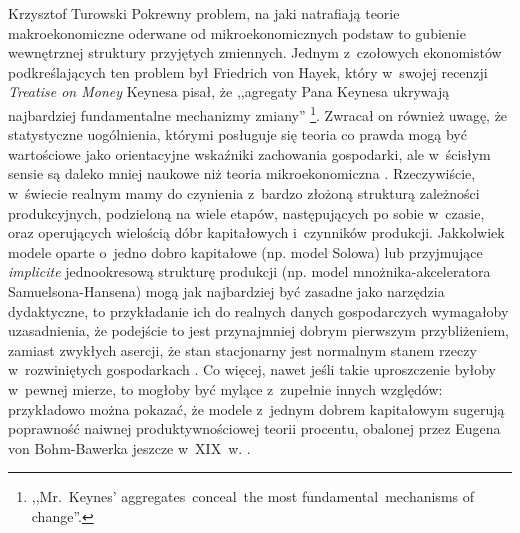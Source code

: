 \begin{artplenv}{Krzysztof Turowski}
Pokrewny problem, na jaki natrafiają teorie makroekonomiczne oderwane od mikroekonomicznych podstaw to gubienie
wewnętrznej struktury przyjętych zmiennych. Jednym z~czołowych ekonomistów podkreślających ten problem był Friedrich
von Hayek, który w~swojej recenzji \textit{Treatise on Money} Keynesa pisał, że ,,agregaty Pana Keynesa ukrywają
najbardziej fundamentalne mechanizmy zmiany''
\parencite[s.~277]{hayek_reflections_1931}\footnote{,,Mr.~Keynes'
aggregates~conceal~the most fundamental~mechanisms of change''.}. Zwracał on również uwagę, że statystyczne uogólnienia,
którymi posługuje się teoria co prawda mogą być wartościowe jako orientacyjne wskaźniki zachowania gospodarki,
ale w~ścisłym sensie są daleko mniej naukowe niż teoria mikroekonomiczna
\parencite{hayek_competition_2002}.
Rzeczywiście, w~świecie realnym mamy do czynienia z~bardzo złożoną strukturą zależności produkcyjnych, podzieloną na
wiele etapów, następujących po sobie w~czasie, oraz operujących wielością dóbr kapitałowych i~czynników produkcji.
Jakkolwiek modele oparte o~jedno dobro kapitałowe (np. model Solowa) lub przyjmujące \textit{implicite} jednookresową
strukturę produkcji (np. model mnożnika-akceleratora Samuelsona-Hansena) mogą jak najbardziej być zasadne jako
narzędzia dydaktyczne, to przykładanie ich do realnych danych gospodarczych wymagałoby uzasadnienia, że podejście to
jest przynajmniej dobrym pierwszym przybliżeniem, zamiast zwykłych asercji, że stan stacjonarny jest normalnym stanem
rzeczy w~rozwiniętych gospodarkach
\parencite{solow_growth_1970}.
Co więcej, nawet jeśli takie uproszczenie
byłoby w~pewnej mierze, to mogłoby być mylące z~zupełnie innych względów: przykładowo można pokazać, że modele z~jednym
dobrem kapitałowym sugerują poprawność naiwnej produktywnościowej teorii procentu, obalonej przez Eugena von
Bohm-Bawerka jeszcze w~XIX~w.
\parencite{murphy_dangers_2005}.


\end{artplenv}
